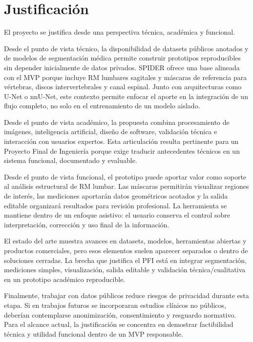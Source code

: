 \chapter{Justificaci\'on}

El proyecto se justifica desde una perspectiva t\'ecnica, acad\'emica y funcional.

Desde el punto de vista t\'ecnico, la disponibilidad de datasets p\'ublicos anotados y de modelos de segmentaci\'on m\'edica permite construir prototipos reproducibles sin depender inicialmente de datos privados. SPIDER ofrece una base alineada con el MVP porque incluye RM lumbares sagitales y m\'ascaras de referencia para v\'ertebras, discos intervertebrales y canal espinal. Junto con arquitecturas como U-Net o nnU-Net, este contexto permite enfocar el aporte en la integraci\'on de un flujo completo, no solo en el entrenamiento de un modelo aislado.

Desde el punto de vista acad\'emico, la propuesta combina procesamiento de im\'agenes, inteligencia artificial, dise\~no de software, validaci\'on t\'ecnica e interacci\'on con usuarios expertos. Esta articulaci\'on resulta pertinente para un Proyecto Final de Ingenier\'ia porque exige traducir antecedentes t\'ecnicos en un sistema funcional, documentado y evaluable.

Desde el punto de vista funcional, el prototipo puede aportar valor como soporte al an\'alisis estructural de RM lumbar. Las m\'ascaras permitir\'an visualizar regiones de inter\'es, las mediciones aportar\'an datos geom\'etricos acotados y la salida editable organizar\'a resultados para revisi\'on profesional. La herramienta se mantiene dentro de un enfoque asistivo: el usuario conserva el control sobre interpretaci\'on, correcci\'on y uso final de la informaci\'on.

El estado del arte muestra avances en datasets, modelos, herramientas abiertas y productos comerciales, pero esos elementos suelen aparecer separados o dentro de soluciones cerradas. La brecha que justifica el PFI est\'a en integrar segmentaci\'on, mediciones simples, visualizaci\'on, salida editable y validaci\'on t\'ecnica/cualitativa en un prototipo acad\'emico reproducible.

Finalmente, trabajar con datos p\'ublicos reduce riesgos de privacidad durante esta etapa. Si en trabajos futuros se incorporaran estudios cl\'inicos no p\'ublicos, deber\'ian contemplarse anonimizaci\'on, consentimiento y resguardo normativo. Para el alcance actual, la justificaci\'on se concentra en demostrar factibilidad t\'ecnica y utilidad funcional dentro de un MVP responsable.

